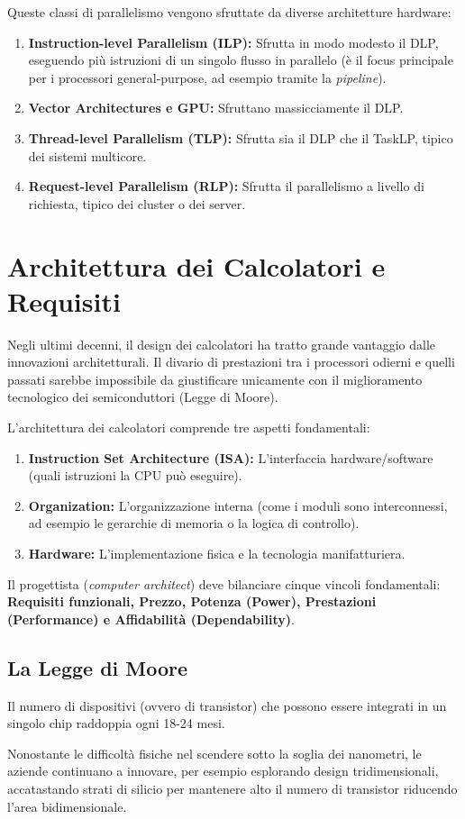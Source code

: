 Queste classi di parallelismo vengono sfruttate da diverse architetture hardware:
\begin{enumerate}
    \item \textbf{Instruction-level Parallelism (ILP):} Sfrutta in modo modesto il DLP, eseguendo più istruzioni di un singolo flusso in parallelo (è il focus principale per i processori general-purpose, ad esempio tramite la \textit{pipeline}).
    \item \textbf{Vector Architectures e GPU:} Sfruttano massicciamente il DLP.
    \item \textbf{Thread-level Parallelism (TLP):} Sfrutta sia il DLP che il TaskLP, tipico dei sistemi multicore.
    \item \textbf{Request-level Parallelism (RLP):} Sfrutta il parallelismo a livello di richiesta, tipico dei cluster o dei server.
\end{enumerate}

\section{Architettura dei Calcolatori e Requisiti}
Negli ultimi decenni, il design dei calcolatori ha tratto grande vantaggio dalle innovazioni architetturali. Il divario di prestazioni tra i processori odierni e quelli passati sarebbe impossibile da giustificare unicamente con il miglioramento tecnologico dei semiconduttori (Legge di Moore).

L'architettura dei calcolatori comprende tre aspetti fondamentali:
\begin{enumerate}
    \item \textbf{Instruction Set Architecture (ISA):} L'interfaccia hardware/software (quali istruzioni la CPU può eseguire).
    \item \textbf{Organization:} L'organizzazione interna (come i moduli sono interconnessi, ad esempio le gerarchie di memoria o la logica di controllo).
    \item \textbf{Hardware:} L'implementazione fisica e la tecnologia manifatturiera.
\end{enumerate}

Il progettista (\textit{computer architect}) deve bilanciare cinque vincoli fondamentali: \textbf{Requisiti funzionali, Prezzo, Potenza (Power), Prestazioni (Performance) e Affidabilità (Dependability)}.

\subsection{La Legge di Moore}
\begin{definition}
Il numero di dispositivi (ovvero di transistor) che possono essere integrati in un singolo chip raddoppia ogni 18-24 mesi.
\end{definition}
Nonostante le difficoltà fisiche nel scendere sotto la soglia dei nanometri, le aziende continuano a innovare, per esempio esplorando design tridimensionali, accatastando strati di silicio per mantenere alto il numero di transistor riducendo l'area bidimensionale.

